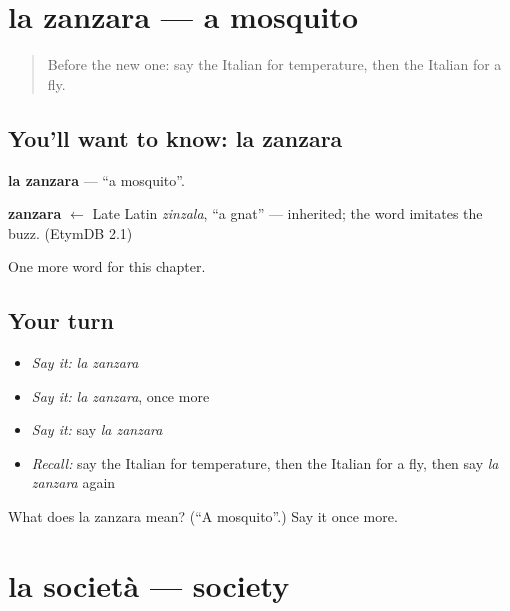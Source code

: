\section[la zanzara]{la zanzara — a mosquito}

\label{lesson:IT-C248-zanzara}



\begin{quote}
Before the new one: say the Italian for temperature, then the Italian for a fly.
\end{quote}

\subsection*{You'll want to know: la zanzara}
\textbf{la zanzara} — \textquotedblleft{}a mosquito\textquotedblright{}.

\begin{cousinweb}
\textbf{zanzara} $\leftarrow$ Late Latin \emph{zinzala}, \textquotedblleft{}a gnat\textquotedblright{} — inherited; the word imitates the buzz. (EtymDB 2.1)
\end{cousinweb}

\begin{grammarlens}[title={What you've built}]
One more word for this chapter.
\end{grammarlens}

\subsection*{Your turn}
\begin{itemize}
\raggedright
  \item \emph{Say it:} \emph{la zanzara}
  \item \emph{Say it:} \emph{la zanzara}, once more
  \item \emph{Say it:} say \emph{la zanzara}
  \item \emph{Recall:} say the Italian for temperature, then the Italian for a fly, then say \emph{la zanzara} again
\end{itemize}

\begin{tcolorbox}[breakable,colback=teal!4,colframe=teal!35!black,title={Before you move on}]
What does la zanzara mean? (\textquotedblleft{}A mosquito\textquotedblright{}.) Say it once more.
\end{tcolorbox}
\section[la società]{la società — society}

